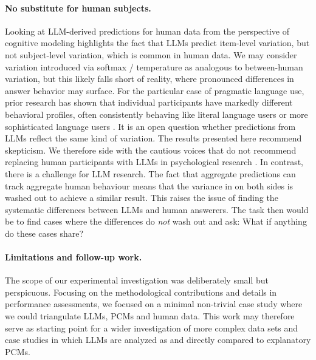 \documentclass[fleqn]{article}
\begin{document}
\paragraph{No substitute for human subjects.}
Looking at LLM-derived predictions for human data from the perspective of cognitive modeling highlights the fact that LLMs predict item-level variation, but not subject-level variation, which is common in human data.
We may consider variation introduced via softmax / temperature as analogous to between-human variation, but this likely falls short of reality, where pronounced differences in answer behavior may surface.
For the particular case of pragmatic language use, prior research has shown that individual participants have markedly different behavioral profiles, often consistently behaving like literal language users or more sophisticated language users \citep[e.g.,][]{NieuwlandDitman2010:On-the-incremen,FrankeDegen2015:Reasoning-in-Re,SpychalskaKontinen2016:Investigating-s}.
It is an open question whether predictions from LLMs reflect the same kind of variation.
The results presented here recommend skepticism.
We therefore side with the cautious voices that do not recommend replacing human participants with LLMs in psychological research \citep{DillionTandon2023:Can-AI-language,HardingDAlessandro2023:AI-language-mod}.
In contrast, there is a challenge for LLM research.
The fact that aggregate predictions can track aggregate human behaviour means that the variance in on both sides is washed out to achieve a similar result.
This raises the issue of finding the systematic differences between LLMs and human answerers.
The task then would be to find cases where the differences do \emph{not} wash out and ask: What if anything do these cases share?

\paragraph{Limitations and follow-up work.}
The scope of our experimental investigation was deliberately small but perspicuous.
Focusing on the methodological contributions and details in performance assessments, we focused on a minimal non-trivial case study where we could triangulate LLMs, PCMs and human data.
This work may therefore serve as starting point for a wider investigation of more complex data sets and case studies in which LLMs are analyzed as and directly compared to explanatory PCMs.


\printbibliography[heading=bibintoc]
\end{document}
